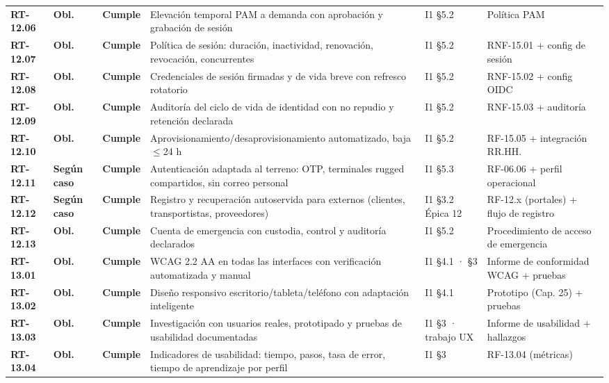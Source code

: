 \begin{small}
\begin{longtable}{@{}p{1.35cm} p{1.15cm} p{1.15cm} p{4.6cm} p{2.35cm} p{3.8cm}@{}}
\textbf{RT-12.06} & \textbf{Obl.} & \textbf{Cumple} & Elevaci\'on temporal PAM a demanda con aprobaci\'on y grabaci\'on de sesi\'on & I1 §5.2 & Pol\'itica PAM \\
\textbf{RT-12.07} & \textbf{Obl.} & \textbf{Cumple} & Pol\'itica de sesi\'on: duraci\'on, inactividad, renovaci\'on, revocaci\'on, concurrentes & I1 §5.2 & RNF-15.01 + config de sesi\'on \\
\textbf{RT-12.08} & \textbf{Obl.} & \textbf{Cumple} & Credenciales de sesi\'on firmadas y de vida breve con refresco rotatorio & I1 §5.2 & RNF-15.02 + config OIDC \\
\textbf{RT-12.09} & \textbf{Obl.} & \textbf{Cumple} & Auditor\'ia del ciclo de vida de identidad con no repudio y retenci\'on declarada & I1 §5.2 & RNF-15.03 + auditor\'ia \\
\textbf{RT-12.10} & \textbf{Obl.} & \textbf{Cumple} & Aprovisionamiento/desaprovisionamiento automatizado, baja $\leq$24 h & I1 §5.2 & RF-15.05 + integraci\'on RR.HH. \\
\textbf{RT-12.11} & \textbf{Según caso} & \textbf{Cumple} & Autenticaci\'on adaptada al terreno: OTP, terminales rugged compartidos, sin correo personal & I1 §5.3 & RF-06.06 + perfil operacional \\
\textbf{RT-12.12} & \textbf{Según caso} & \textbf{Cumple} & Registro y recuperaci\'on autoservida para externos (clientes, transportistas, proveedores) & I1 §3.2 \'Epica 12 & RF-12.x (portales) + flujo de registro \\
\textbf{RT-12.13} & \textbf{Obl.} & \textbf{Cumple} & Cuenta de emergencia con custodia, control y auditor\'ia declarados & I1 §5.2 & Procedimiento de acceso de emergencia \\
\textbf{RT-13.01} & \textbf{Obl.} & \textbf{Cumple} & WCAG 2.2 AA en todas las interfaces con verificaci\'on automatizada y manual & I1 §4.1 · §3 & Informe de conformidad WCAG + pruebas \\
\textbf{RT-13.02} & \textbf{Obl.} & \textbf{Cumple} & Dise\~no responsivo escritorio/tableta/tel\'efono con adaptaci\'on inteligente & I1 §4.1 & Prototipo (Cap. 25) + pruebas \\
\textbf{RT-13.03} & \textbf{Obl.} & \textbf{Cumple} & Investigaci\'on con usuarios reales, prototipado y pruebas de usabilidad documentadas & I1 §3 · trabajo UX & Informe de usabilidad + hallazgos \\
\textbf{RT-13.04} & \textbf{Obl.} & \textbf{Cumple} & Indicadores de usabilidad: tiempo, pasos, tasa de error, tiempo de aprendizaje por perfil & I1 §3 & RF-13.04 (m\'etricas) \\

\end{longtable}
\end{small}
